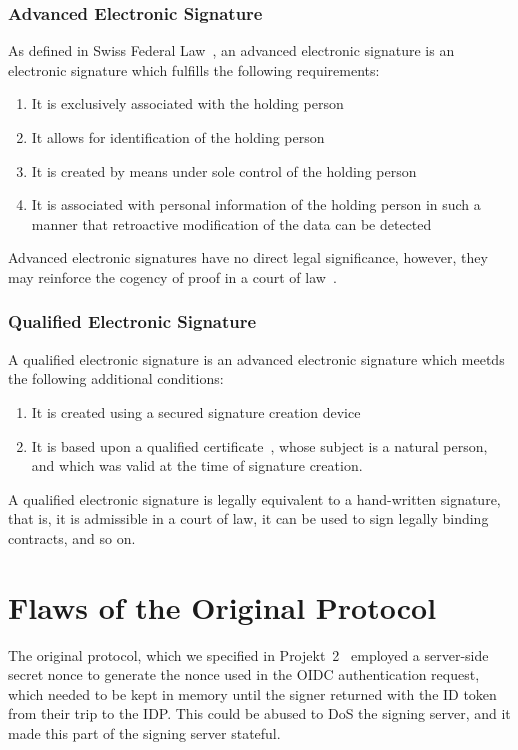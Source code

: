 \subsubsection{Advanced Electronic Signature}
As defined in Swiss Federal Law~\cite[Art. 2]{zertes},
an advanced electronic signature is an electronic signature which fulfills the following requirements:

\begin{enumerate}
    \item It is exclusively associated with the holding person
    \item It allows for identification of the holding person
    \item It is created by means under sole control of the holding person
    \item It is associated with personal information of the holding person in such a manner that retroactive modification of the data can be detected
\end{enumerate}

Advanced electronic signatures have no direct legal significance, however,
they may reinforce the cogency of proof in a court of law~\cite[4.19]{crypto-folien-hassenstein}.

\subsubsection{Qualified Electronic Signature}\label{subsubsec:qualifiedsignature}
A qualified electronic signature is an advanced electronic signature which meetds the following additional conditions:
\begin{enumerate}
    \item It is created using a secured signature creation device~\cite[Art. 6]{zertes}
    \item It is based upon a qualified certificate~\cite[Art. 7 and 8]{zertes}, whose subject is a natural person,
    and which was valid at the time of signature creation.
\end{enumerate}

A qualified electronic signature is legally equivalent to a hand-written signature, that is,
it is admissible in a court of law, it can be used to sign legally binding contracts, and so on.


\section{Flaws of the Original Protocol}\label{sec:flaws-of-the-original-protocol}
The original protocol, which we specified in Projekt~2~\cite{projekt2} employed a server-side secret nonce to generate the nonce used in the \gls{OIDC} authentication request,
which needed to be kept in memory until the signer returned with the ID token from their trip to the \gls{IDP}.
This could be abused to \gls{DoS} the signing server, and it made this part of the signing server stateful.

